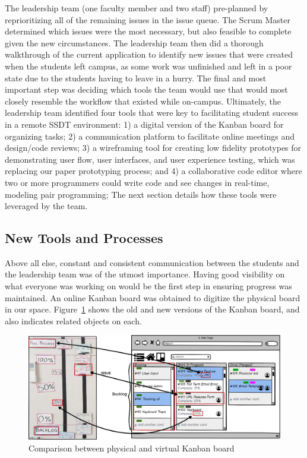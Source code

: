 The leadership team (one faculty member and two staff) pre-planned by reprioritizing all of the remaining issues in the issue queue. The Scrum Master determined which issues were the most necessary, but also feasible to complete given the new circumstances. The leadership team then did a thorough walkthrough of the current application to identify new issues that were created when the students left campus, as some work was unfinished and left in a poor state due to the students having to leave in a hurry. The final and most important step was deciding which tools the team would use that would most closely resemble the workflow that existed while on-campus.  Ultimately, the leadership team identified four tools that were key to facilitating student success in a remote SSDT environment: 1) a digital version of the Kanban board for organizing tasks; 2) a communication platform to facilitate online meetings and design/code reviews; 3) a wireframing tool for creating low fidelity prototypes for demonstrating user flow, user interfaces, and user experience testing, which was replacing our paper prototyping process; and 4) a collaborative code editor where two or more programmers could write code and see changes in real-time, modeling pair programming;  The next section details how these tools were leveraged by the team.

\subsection{New Tools and Processes}
Above all else, constant and consistent communication between the students and the leadership team was of the utmost importance. Having good visibility on what everyone was working on would be the first step in ensuring progress was maintained. An online Kanban board was obtained to digitize the physical board in our space. Figure~\ref{fig:digitalkanban} shows the old and new versions of the Kanban board, and also indicates related objects on each.

\begin{figure}[h]
 \centering
 \includegraphics[width=\linewidth]{newTrellomockup2.png}
 \caption{Comparison between physical and virtual Kanban board}
 \label{fig:digitalkanban}
\end{figure}

